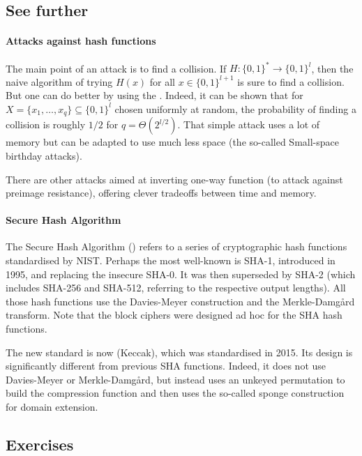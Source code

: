 \documentclass[a4paper, 11pt, openany]{book}
\begin{document}
\subsection{See further}

\paragraph{Attacks against hash functions}
The main point of an attack is to find a collision. If $H : \{0,1\}^* \to \{0,1\}^l$, then the naive algorithm of trying $H(x)$ for all $x \in \{0,1\}^{l+1}$ is sure to find a collision. But one can do better by using the . Indeed, it can be shown that for $X = \{x_1, \dots, x_q\} \subseteq \{0,1\}^l$ chosen uniformly at random, the probability of finding a collision is roughly $1/2$ for $q = \Theta(2^{l/2})$. That simple attack uses a lot of memory but can be adapted to use much less space (the so-called Small-space birthday attacks).

There are other attacks aimed at inverting one-way function (to attack against preimage resistance), offering clever tradeoffs between time and memory.


\paragraph{Secure Hash Algorithm}
The Secure Hash Algorithm () refers to a series of cryptographic hash functions standardised by NIST. Perhaps the most well-known is SHA-1, introduced in 1995, and replacing the insecure SHA-0. It was then superseded by SHA-2 (which includes SHA-256 and SHA-512, referring to the respective output lengths). All those hash functions use the Davies-Meyer construction and the Merkle-Damg\aa{}rd transform. Note that the block ciphers were designed ad hoc for the SHA hash functions.

The new standard is now  (Keccak), which was standardised in 2015. Its design is significantly different from previous SHA functions. Indeed, it does not use Davies-Meyer or Merkle-Damg\aa{}rd, but instead uses an unkeyed permutation to build the compression function and then uses the so-called sponge construction for domain extension.



\subsection{Exercises}
\end{document}
